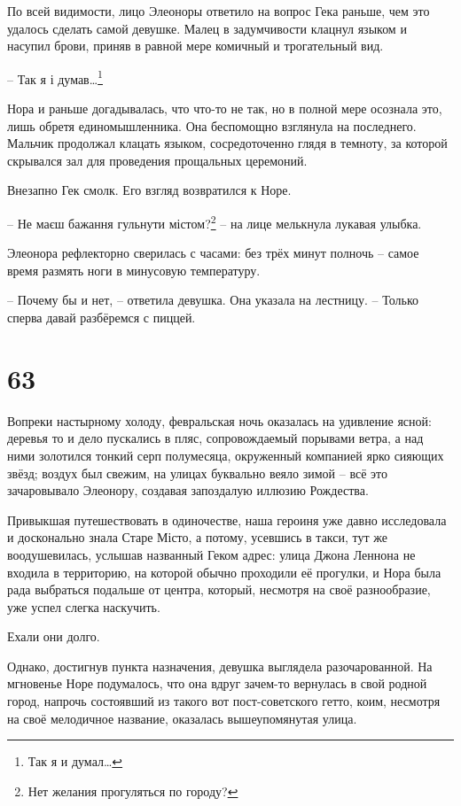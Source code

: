 \documentclass[
  a5paperpaper,
  DIV=11,
  numbers=noendperiod]{scrreprt}
\begin{document}
По всей видимости, лицо Элеоноры ответило на вопрос Гека раньше, чем это
удалось сделать самой девушке. Малец в задумчивости клацнул языком и
насупил брови, приняв в равной мере комичный и трогательный вид.

-- Так я і думав\ldots{}\footnote{Так я и думал\ldots{}}

Нора и раньше догадывалась, что что-то не так, но в полной мере осознала
это, лишь обретя единомышленника. Она беспомощно взглянула на
последнего. Мальчик продолжал клацать языком, сосредоточенно глядя в
темноту, за которой скрывался зал для проведения прощальных церемоний.

Внезапно Гек смолк. Его взгляд возвратился к Норе.

-- Не маєш бажання гульнути містом?\footnote{Нет желания прогуляться по
  городу?} -- на лице мелькнула лукавая улыбка.

Элеонора рефлекторно сверилась с часами: без трёх минут полночь -- самое
время размять ноги в минусовую температуру.

-- Почему бы и нет, -- ответила девушка. Она указала на лестницу. --
Только сперва давай разбёремся с пиццей.

\section*{63}\label{63}


Вопреки настырному холоду, февральская ночь оказалась на удивление
ясной: деревья то и дело пускались в пляс, сопровождаемый порывами
ветра, а над ними золотился тонкий серп полумесяца, окруженный компанией
ярко сияющих звёзд; воздух был свежим, на улицах буквально веяло зимой
-- всё это зачаровывало Элеонору, создавая запоздалую иллюзию Рождества.

Привыкшая путешествовать в одиночестве, наша героиня уже давно
исследовала и досконально знала Старе Місто, а потому, усевшись в такси,
тут же воодушевилась, услышав названный Геком адрес: улица Джона Леннона
не входила в территорию, на которой обычно проходили её прогулки, и Нора
была рада выбраться подальше от центра, который, несмотря на своё
разнообразие, уже успел слегка наскучить.

Ехали они долго.

Однако, достигнув пункта назначения, девушка выглядела разочарованной.
На мгновенье Норе подумалось, что она вдруг зачем-то вернулась в свой
родной город, напрочь состоявший из такого вот пост-советского гетто,
коим, несмотря на своё мелодичное название, оказалась вышеупомянутая
улица.
\end{document}
